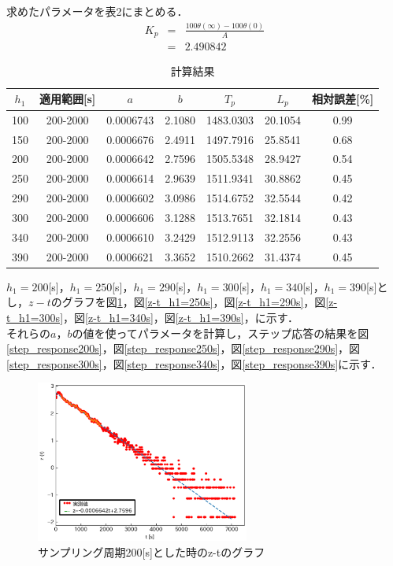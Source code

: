\documentclass[12pt]{jsarticle}
\begin{document}
求めたパラメータを表2にまとめる．
\begin{eqnarray}
  \label{K_p}
  K_p &=& \frac{100 \theta(\infty)- 100 \theta(0)}{A} \\
      &=& 2.490842
\end{eqnarray}
\begin{table}[tb]
  \label{Experiment_ab}
  \caption{計算結果}
  \begin{tabular}{|c|c|c|c|c|c|c|} \hline
    $h_1$ & 適用範囲[s] & $a$ & $b$ & $T_p$ & $L_p$ & 相対誤差[\%] \\ \hline \hline
    100 & 200-2000 & 0.0006743 & 2.1080 & 1483.0303 & 20.1054 & 0.99 \\ \hline
    150 & 200-2000 & 0.0006676 & 2.4911 & 1497.7916 & 25.8541 & 0.68 \\ \hline
    200 & 200-2000 & 0.0006642 & 2.7596 & 1505.5348 & 28.9427 & 0.54 \\ \hline
    250 & 200-2000 & 0.0006614 & 2.9639 & 1511.9341 & 30.8862 & 0.45 \\ \hline
    290 & 200-2000 & 0.0006602 & 3.0986 & 1514.6752 & 32.5544 & 0.42 \\ \hline
    300 & 200-2000 & 0.0006606 & 3.1288 & 1513.7651 & 32.1814 & 0.43 \\ \hline
    340 & 200-2000 & 0.0006610 & 3.2429 & 1512.9113 & 32.2556 & 0.43 \\ \hline
    390 & 200-2000 & 0.0006621 & 3.3652 & 1510.2662 & 31.4374 & 0.45 \\ \hline
  \end{tabular}
\end{table}
$h_1=200$[s]，$h_1=250$[s]，$h_1=290$[s]，$h_1=300$[s]，$h_1=340$[s]，$h_1=390$[s]とし，$z-t$のグラフを図\ref{z-t_h1=200s}，図\ref{z-t_h1=250s}，図\ref{z-t_h1=290s}，図\ref{z-t_h1=300s}，図\ref{z-t_h1=340s}，図\ref{z-t_h1=390s}，に示す．\\
それらの$a$，$b$の値を使ってパラメータを計算し，ステップ応答の結果を図\ref{step_response200s}，図\ref{step_response250s}，図\ref{step_response290s}，図\ref{step_response300s}，図\ref{step_response340s}，図\ref{step_response390s}に示す．\\
\begin{figure}[H]
  \begin{center}
    \includegraphics[clip,width=7.0cm]{../graph/z-t200s.eps}
    \caption{サンプリング周期200[s]とした時のz-tのグラフ}
    \label{z-t_h1=200s}
  \end{center}
\end{figure}
\end{document}
